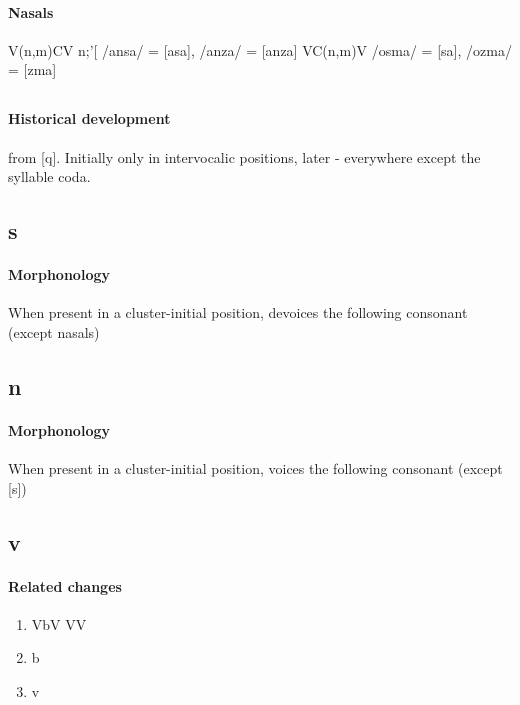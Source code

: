 \documentclass[8pt]{book}
\begin{document}
\paragraph{Nasals}

\begin{exe}
\ex V(n,m)CV \textrightarrow n;'[ /ansa/ = [asa], /anza/ = [anza]
\ex VC(n,m)V \textrightarrow /osma/ = [\textopeno sa], /ozma/ = [\textopeno zma] 
\end{exe}

\subsection{}
\paragraph{Historical development} from [q]. Initially only in intervocalic positions, later - everywhere except the syllable coda.

\subsection{s}
\paragraph{Morphonology} When present in a cluster-initial position, devoices the following consonant (except nasals)

\subsection{n}
\paragraph{Morphonology} When present in a cluster-initial position, voices the following consonant (except [s])

\subsection{v}
\paragraph{Related changes}
\begin{enumerate}
\item VbV \textrightarrow VV
\item b \textrightarrow {}
\item {} \textrightarrow v
\end{enumerate}
\end{document}
